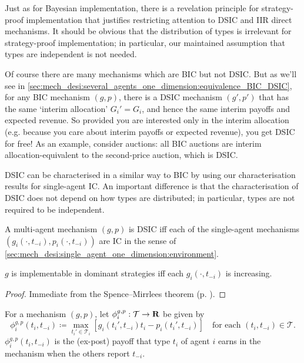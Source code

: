 \documentclass[11pt,letterpaper,reqno,oneside]{article}
\begin{document}
Just as for Bayesian implementation, there is a revelation principle for strategy-proof implementation that justifies restricting attention to DSIC and IIR direct mechanisms. It should be obvious that the distribution of types is irrelevant for strategy-proof implementation; in particular, our maintained assumption that types are independent is not needed.

Of course there are many mechanisms which are BIC but not DSIC. But as we'll see in \cref{sec:mech_desi:several_agents_one_dimension:equivalence_BIC_DSIC}, for any BIC mechanism $(g,p)$, there is a DSIC mechanism $(g',p')$ that has the same `interim allocation' $G_i'=G_i$, and hence the same interim payoffs and expected revenue. So provided you are interested only in the interim allocation (e.g. because you care about interim payoffs or expected revenue), you get DSIC for free! As an example, consider auctions: all BIC auctions are interim allocation-equivalent to the second-price auction, which is DSIC.

DSIC can be characterised in a similar way to BIC by using our characterisation results for single-agent IC. An important difference is that the characterisation of DSIC does not depend on how types are distributed; in particular, types are not required to be independent.
%
\begin{observation}
	A multi-agent mechanism $(g,p)$ is DSIC iff each of the single-agent mechanisms $(g_i(\cdot,t_{-i}),p_i(\cdot,t_{-i}))$ are IC in the sense of \cref{sec:mech_desi:single_agent_one_dimension:environment}.
\end{observation}


\begin{corollary}
	\label{corollary:implementable_monotone_1d_DSIC}
	$g$ is implementable in dominant strategies iff each $g_i(\cdot,t_{-i})$ is increasing.
\end{corollary}

\begin{proof}
	Immediate from the Spence--Mirrlees theorem (p. \pageref{theorem:implementable_monotone_1d}).
\end{proof}


For a mechanism $(g,p)$, let $\phi^{g,p}_i : \mathcal{T} \to \mathbf{R}$ be given by
%
\begin{equation*}
	\phi^{g,p}_i(t_i,t_{-i}) \coloneqq \max_{t_i' \in \mathcal{T}_i} 
	\left[ g_i(t_i',t_{-i}) t_i - p_i(t_i',t_{-i}) \right]
	\quad \text{for each $(t_i,t_{-i}) \in \mathcal{T}$} .
\end{equation*}
%
$\phi^{g,p}_i(t_i,t_{-i})$ is the (ex-post) payoff that type $t_i$ of agent $i$ earns in the mechanism when the others report $t_{-i}$.
\end{document}

